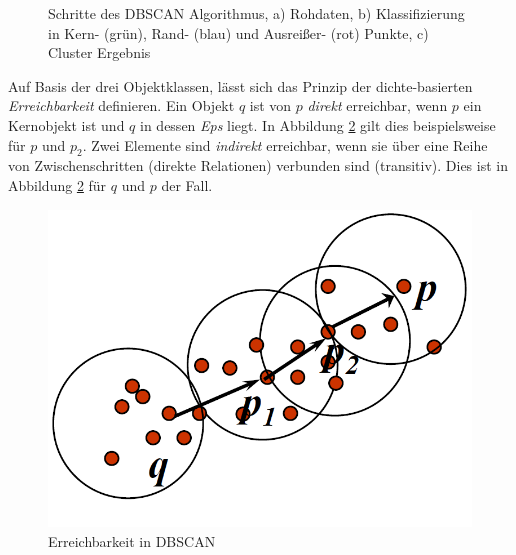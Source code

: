 \begin{figure}[H]
    \centering
    \caption[Schritte des DBSCAN Algorithmus]{Schritte des DBSCAN Algorithmus, a) Rohdaten, b) Klassifizierung in Kern- (grün), Rand- (blau) und Ausreißer- (rot) Punkte, c) Cluster Ergebnis \cite[]{Gao2012}}
    \label{fig:grund_dbscan_clustering}
\end{figure}

Auf Basis der drei Objektklassen, lässt sich das Prinzip der dichte-basierten \textit{Erreichbarkeit} definieren.
Ein Objekt $q$ ist von $p$ \textit{direkt} erreichbar, wenn $p$ ein Kernobjekt ist und $q$ in dessen \textit{Eps} liegt.
In Abbildung \ref{fig:grund_dbscan_reachability} gilt dies beispielsweise für $p$ und $p_2$.
Zwei Elemente sind \textit{indirekt} erreichbar, wenn sie über eine Reihe von Zwischenschritten (direkte Relationen)
verbunden sind (transitiv). Dies ist in Abbildung \ref{fig:grund_dbscan_reachability} für $q$ und $p$ der Fall.

\begin{figure}[H]
    \centering
    \includegraphics[width=0.32\linewidth]{resources/img/grundlagen/clustering_dbscan/reachability}
    \caption[Erreichbarkeit in DBSCAN]{Erreichbarkeit in DBSCAN \cite[]{Gao2012}}
    \label{fig:grund_dbscan_reachability}
\end{figure}


